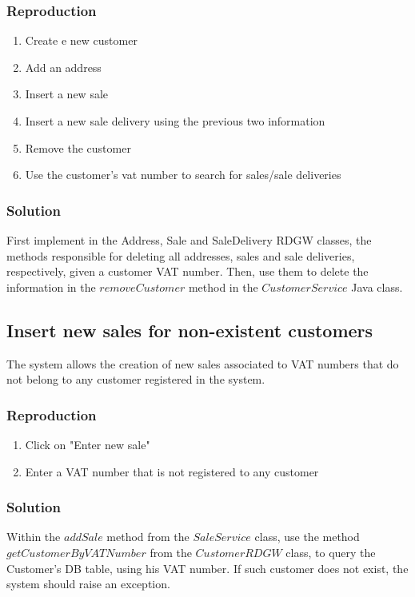 \documentclass[12pt]{article}
\begin{document}
\subsubsection{Reproduction}
\begin{enumerate}
   \item  Create e new customer
   
   \item  Add an address
   
   \item  Insert a new sale
   
   \item  Insert a new sale delivery using the previous two information
      
   \item  Remove the customer
      
   \item  Use the customer's vat number to search for sales/sale deliveries
\end{enumerate}


\subsubsection{Solution}
First implement in the Address, Sale and SaleDelivery RDGW classes, the methods responsible for deleting all addresses, sales and sale deliveries, respectively, given a customer VAT number. Then, use them to delete the information in the $removeCustomer$ method in the $CustomerService$ Java class.
\newpage
\subsection{Insert new sales for non-existent customers}
The system allows the creation of new sales associated to VAT numbers that do not belong to any customer registered in the system.

\subsubsection{Reproduction}
\begin{enumerate}
   \item  Click on "Enter new sale"
   
   \item  Enter a VAT number that is not registered to any customer
\end{enumerate}


\subsubsection{Solution}
Within the $addSale$ method from the $SaleService$ class, use the method $getCustomerByVATNumber$ from the $CustomerRDGW$ class, to query the Customer's DB table, using his VAT number. If such customer does not exist, the system should raise an exception.
\end{document}
